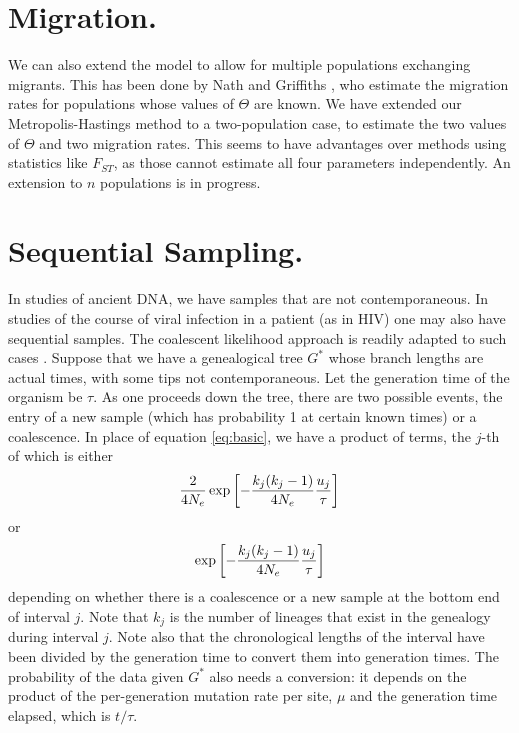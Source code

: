 \section{Migration.}  We can also extend the model to allow for multiple
populations exchanging migrants.  This has been done by Nath and Griffiths
\cite{Nath96}, who estimate the migration rates for populations whose values of
$\Theta$ are known.  We have \cite{Beerli99} extended our Metropolis-Hastings
method to a two-population case, to estimate the two values of $\Theta$
and two migration rates.  This seems to have advantages over methods
using statistics like $F_{ST}$, as those cannot estimate all four
parameters independently.  An extension to $n$ populations is in progress.

\section{Sequential Sampling.}  In studies of ancient DNA, we have samples
that are not contemporaneous.  In studies of the course of viral infection
in a patient (as in HIV) one may also have sequential samples.  The
coalescent likelihood approach is readily adapted to such cases
\cite{Rodrigo98}.  Suppose
that we have a genealogical tree $G^*$ whose branch lengths are
actual times, with some tips not contemporaneous.    Let the generation
time of the organism be $\tau$.  As one proceeds down the tree, there are
two possible events, the entry of a new sample (which has probability 1
at certain known times) or a coalescence.  In place of equation \ref{eq:basic},
we have a product of terms, the $j$-th of which is either
\begin{equation} %
\frac{2}{4N_e} \exp\left[-{k_j(k_j-1) \over 4N_e } {u_j \over \tau} \right]
\end{equation}
or
\begin{equation} %
\exp\left[-{k_j(k_j-1) \over 4N_e } {u_j \over \tau} \right]
\end{equation}
depending on whether there is a coalescence or a new sample at the bottom
end of interval $j$.  Note that $k_j$ is the number of lineages that exist
in the genealogy during interval $j$.  Note also that the chronological
lengths of the interval have been divided by the generation time to convert
them into generation times.  The probability of the data given $G^*$ also
needs a
conversion: it depends on the product of the per-generation mutation rate per
site, $\mu$ and the generation time elapsed, which is $t/\tau$.

